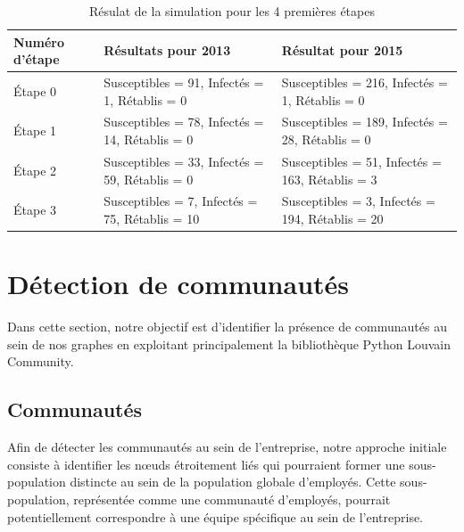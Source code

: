 \documentclass{article}
\begin{document}
\begin{table}[!h]
    \centering
    \begin{tabular}{|p{2.5cm}|p{5cm}|p{5cm}|}
        \hline
        \textbf{Numéro d'étape} & \textbf{Résultats pour 2013}                    & \textbf{Résultat pour 2015}                    \\
        \hline
        Étape 0                 & Susceptibles = 91, Infectés = 1, Rétablis = 0   & Susceptibles = 216, Infectés = 1, Rétablis = 0
        \\
        \hline
        Étape 1                 & Susceptibles = 78, Infectés = 14, Rétablis = 0
                                & Susceptibles = 189, Infectés = 28, Rétablis = 0
        \\
        \hline
        Étape 2                 & Susceptibles = 33, Infectés = 59, Rétablis = 0
                                & Susceptibles = 51, Infectés = 163, Rétablis = 3
        \\
        \hline
        Étape 3                 & Susceptibles = 7, Infectés = 75, Rétablis = 10
                                & Susceptibles = 3, Infectés = 194, Rétablis = 20
        \\
        \hline
    \end{tabular}
    \caption{Résulat de la simulation pour les 4 premières étapes}
    \label{tab:simulation_results}
\end{table}

\newpage
\section{Détection de communautés}

Dans cette section, notre objectif est d'identifier la présence de communautés au sein de nos graphes en exploitant principalement la bibliothèque Python Louvain Community.

\subsection{Communautés}

Afin de détecter les communautés au sein de l'entreprise, notre approche initiale consiste à identifier les nœuds étroitement liés qui pourraient former une sous-population distincte au sein de la population globale d'employés. Cette sous-population, représentée comme une communauté d'employés, pourrait potentiellement correspondre à une équipe spécifique au sein de l'entreprise. \\
\end{document}
